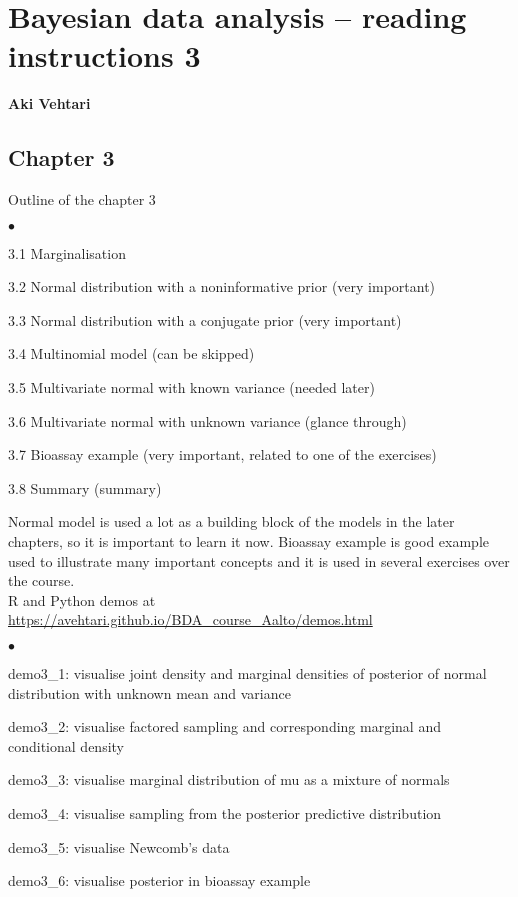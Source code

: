 \documentclass[a4paper,11pt,english]{article}
\begin{document}
\thispagestyle{empty}

\section*{Bayesian data analysis -- reading instructions 3} 
\smallskip
{\bf Aki Vehtari}
\smallskip

\subsection*{Chapter 3}

Outline of the chapter 3
\begin{list}{$\bullet$}{\parsep=0pt\itemsep=2pt}
\item 3.1 Marginalisation
\item 3.2 Normal distribution with a noninformative prior (very important)
\item 3.3 Normal distribution with a conjugate prior (very important)
\item 3.4 Multinomial model (can be skipped)
\item 3.5 Multivariate normal with known variance (needed later)
\item 3.6 Multivariate normal with unknown variance (glance through)
\item 3.7 Bioassay example (very important, related to one of the exercises)
\item 3.8 Summary (summary)
\end{list}

Normal model is used a lot as a building block of the models in the
later chapters, so it is important to learn it now.
Bioassay example is good example used to illustrate many important
concepts and it is used in several exercises over the course.\\

R and Python demos at \url{https://avehtari.github.io/BDA_course_Aalto/demos.html}
\begin{list}{$\bullet$}{\parsep=0pt\itemsep=2pt}
\item demo3\_1: visualise joint density and marginal densities of
  posterior of normal distribution with unknown mean and variance
\item demo3\_2: visualise factored sampling and corresponding
  marginal and conditional density
\item demo3\_3: visualise marginal distribution of mu as a mixture of normals
\item demo3\_4: visualise sampling from the posterior predictive distribution
\item demo3\_5: visualise Newcomb's data
\item demo3\_6: visualise posterior in bioassay example
\end{list}
\end{document}
